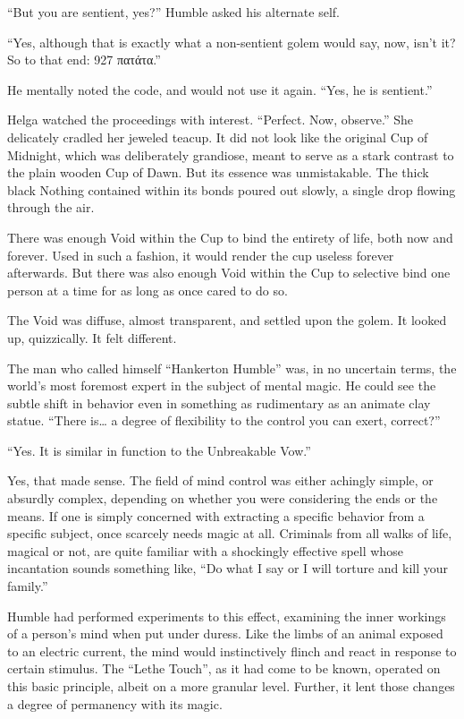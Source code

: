 “But you are sentient, yes?” Humble asked his alternate self.

“Yes, although that is exactly what a non-sentient golem would say, now, isn’t it? So to that end: 927 πατάτα.”

He mentally noted the code, and would not use it again. “Yes, he is sentient.”

Helga watched the proceedings with interest. “Perfect. Now, observe.” She delicately cradled her jeweled teacup. It did not look like the original Cup of Midnight, which was deliberately grandiose, meant to serve as a stark contrast to the plain wooden Cup of Dawn. But its essence was unmistakable. The thick black Nothing contained within its bonds poured out slowly, a single drop flowing through the air.

There was enough Void within the Cup to bind the entirety of life, both now and forever. Used in such a fashion, it would render the cup useless forever afterwards. But there was also enough Void within the Cup to selective bind one person at a time for as long as once cared to do so.

The Void was diffuse, almost transparent, and settled upon the golem. It looked up, quizzically. It felt different.

The man who called himself “Hankerton Humble” was, in no uncertain terms, the world’s most foremost expert in the subject of mental magic. He could see the subtle shift in behavior even in something as rudimentary as an animate clay statue. “There is… a degree of flexibility to the control you can exert, correct?”

“Yes. It is similar in function to the Unbreakable Vow.”

Yes, that made sense. The field of mind control was either achingly simple, or absurdly complex, depending on whether you were considering the ends or the means. If one is simply concerned with extracting a specific behavior from a specific subject, once scarcely needs magic at all. Criminals from all walks of life, magical or not, are quite familiar with a shockingly effective spell whose incantation sounds something like, “Do what I say or I will torture and kill your family.”

Humble had performed experiments to this effect, examining the inner workings of a person’s mind when put under duress. Like the limbs of an animal exposed to an electric current, the mind would instinctively flinch and react in response to certain stimulus. The “Lethe Touch”, as it had come to be known, operated on this basic principle, albeit on a more granular level. Further, it lent those changes a degree of permanency with its magic.

